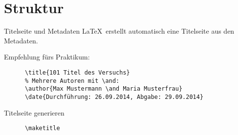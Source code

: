 \section{Struktur}

\begin{frame}[fragile]{Titelseite und Metadaten}
  \LaTeX\ erstellt automatisch eine Titelseite aus den Metadaten.

  \begin{block}{Empfehlung fürs Praktikum:}
    \begin{lstlisting}
      \title{101 Titel des Versuchs}
      % Mehrere Autoren mit \and:
      \author{Max Mustermann \and Maria Musterfrau}
      \date{Durchführung: 26.09.2014, Abgabe: 29.09.2014}
    \end{lstlisting}
  \end{block}

  \begin{block}{Titelseite generieren}
    \begin{lstlisting}
      \maketitle
    \end{lstlisting}
  \end{block}
\end{frame}

